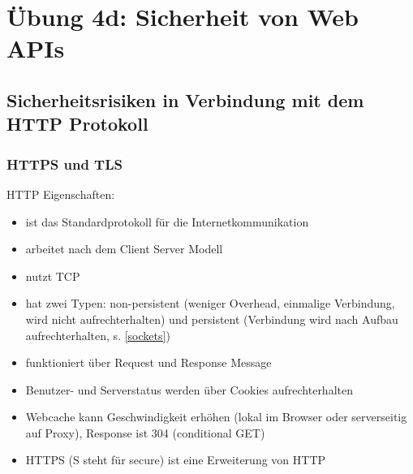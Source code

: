 \documentclass[notitlepage, hidelinks]{article}
\begin{document}
\newpage
\section{Übung 4d: Sicherheit von Web APIs}
\subsection{Sicherheitsrisiken in Verbindung mit dem HTTP Protokoll}

\subsubsection{HTTPS und TLS}
HTTP Eigenschaften:
\begin{itemize}
\item ist das Standardprotokoll für die Internetkommunikation
\item arbeitet nach dem Client Server Modell
\item nutzt TCP
\item hat zwei Typen: non-persistent (weniger Overhead, einmalige Verbindung, wird nicht aufrechterhalten) und persistent (Verbindung wird nach Aufbau aufrechterhalten, s. \ref{sockets})
\item funktioniert über Request und Response Message
\item Benutzer- und Serverstatus werden über Cookies aufrechterhalten
\item Webcache kann Geschwindigkeit erhöhen (lokal im Browser oder serverseitig auf Proxy), Response ist 304 (conditional GET)
\item HTTPS (S steht für secure) ist eine Erweiterung von HTTP
\end{itemize}
\end{document}
